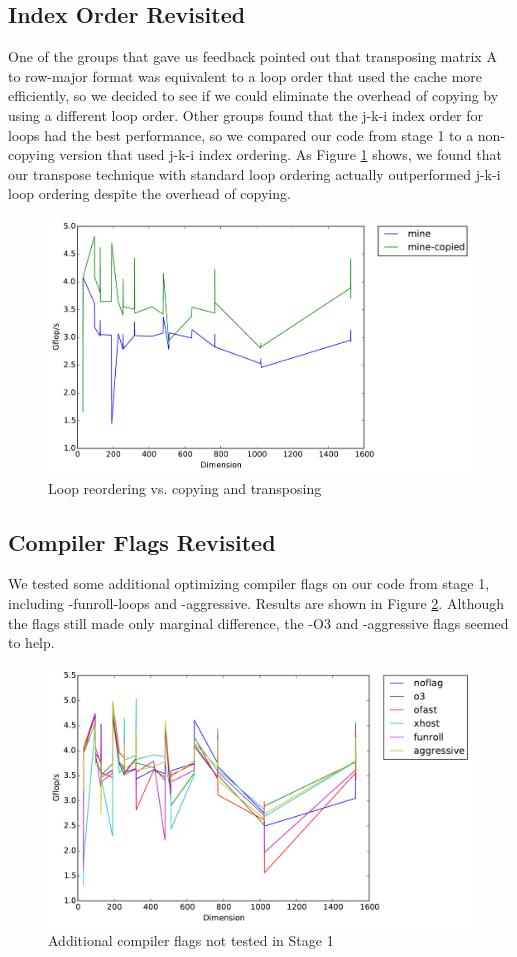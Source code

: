 \documentclass[letterpaper]{article}	 %
\begin{document}
\subsection{Index Order Revisited}
One of the groups that gave us feedback pointed out that transposing matrix A to row-major format was equivalent to a loop order that used the cache more efficiently, so we decided to see if we could eliminate the overhead of copying by using a different loop order. Other groups found that the j-k-i index order for loops had the best performance, so we compared our code from stage 1 to a non-copying version that used j-k-i index ordering. As Figure \ref{fig:copying-looporder} shows, we found that our transpose technique with standard loop ordering actually outperformed j-k-i loop ordering despite the overhead of copying.

\begin{figure}[H]
	\centering
	\includegraphics[width=.6\linewidth]{timing-copying_looporder.pdf}
	\caption{Loop reordering vs. copying and transposing}
	\label{fig:copying-looporder}
\end{figure}

\subsection{Compiler Flags Revisited}
We tested some additional optimizing compiler flags on our code from stage 1, including -funroll-loops and -aggressive. Results are shown in Figure \ref{fig:stage1-flags}. Although the flags still made only marginal difference, the -O3 and -aggressive flags seemed to help.

\begin{figure}[H]
	\centering
	\includegraphics[width=.6\linewidth]{timing-flags_stage1.pdf}
	\caption{Additional compiler flags not tested in Stage 1}
	\label{fig:stage1-flags}
\end{figure}
\end{document}
